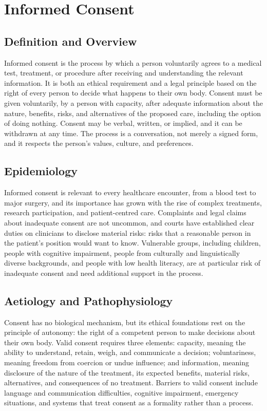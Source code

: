 \chapter{Informed Consent}

\section*{Definition and Overview}
Informed consent is the process by which a person voluntarily agrees to a medical test, treatment, or procedure after receiving and understanding the relevant information. It is both an ethical requirement and a legal principle based on the right of every person to decide what happens to their own body. Consent must be given voluntarily, by a person with capacity, after adequate information about the nature, benefits, risks, and alternatives of the proposed care, including the option of doing nothing. Consent may be verbal, written, or implied, and it can be withdrawn at any time. The process is a conversation, not merely a signed form, and it respects the person's values, culture, and preferences.

\section*{Epidemiology}
Informed consent is relevant to every healthcare encounter, from a blood test to major surgery, and its importance has grown with the rise of complex treatments, research participation, and patient-centred care. Complaints and legal claims about inadequate consent are not uncommon, and courts have established clear duties on clinicians to disclose material risks: risks that a reasonable person in the patient's position would want to know. Vulnerable groups, including children, people with cognitive impairment, people from culturally and linguistically diverse backgrounds, and people with low health literacy, are at particular risk of inadequate consent and need additional support in the process.

\section*{Aetiology and Pathophysiology}
Consent has no biological mechanism, but its ethical foundations rest on the principle of autonomy: the right of a competent person to make decisions about their own body. Valid consent requires three elements: capacity, meaning the ability to understand, retain, weigh, and communicate a decision; voluntariness, meaning freedom from coercion or undue influence; and information, meaning disclosure of the nature of the treatment, its expected benefits, material risks, alternatives, and consequences of no treatment. Barriers to valid consent include language and communication difficulties, cognitive impairment, emergency situations, and systems that treat consent as a formality rather than a process.

